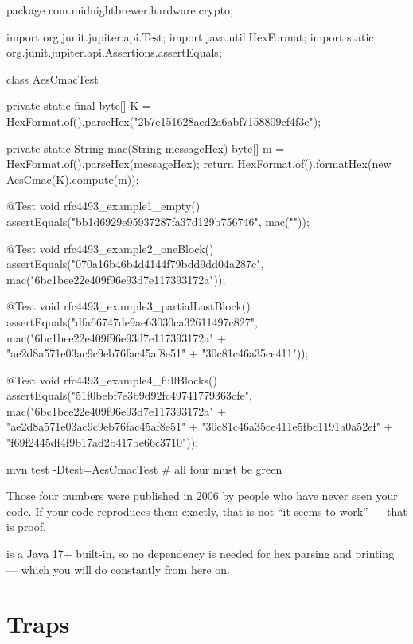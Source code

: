 \begin{jcode}
package com.midnightbrewer.hardware.crypto;

import org.junit.jupiter.api.Test;
import java.util.HexFormat;
import static org.junit.jupiter.api.Assertions.assertEquals;

class AesCmacTest {

    private static final byte[] K =
            HexFormat.of().parseHex("2b7e151628aed2a6abf7158809cf4f3c");

    private static String mac(String messageHex) {
        byte[] m = HexFormat.of().parseHex(messageHex);
        return HexFormat.of().formatHex(new AesCmac(K).compute(m));
    }

    @Test
    void rfc4493_example1_empty() {
        assertEquals("bb1d6929e95937287fa37d129b756746", mac(""));
    }

    @Test
    void rfc4493_example2_oneBlock() {
        assertEquals("070a16b46b4d4144f79bdd9dd04a287c",
                mac("6bc1bee22e409f96e93d7e117393172a"));
    }

    @Test
    void rfc4493_example3_partialLastBlock() {
        assertEquals("dfa66747de9ae63030ca32611497c827",
                mac("6bc1bee22e409f96e93d7e117393172a"
                  + "ae2d8a571e03ac9c9eb76fac45af8e51"
                  + "30c81c46a35ce411"));
    }

    @Test
    void rfc4493_example4_fullBlocks() {
        assertEquals("51f0bebf7e3b9d92fc49741779363cfe",
                mac("6bc1bee22e409f96e93d7e117393172a"
                  + "ae2d8a571e03ac9c9eb76fac45af8e51"
                  + "30c81c46a35ce411e5fbc1191a0a52ef"
                  + "f69f2445df4f9b17ad2b417be66c3710"));
    }
}
\end{jcode}

\begin{verifybox}
\begin{shell}
mvn test -Dtest=AesCmacTest      # all four must be green
\end{shell}
Those four numbers were published in 2006 by people who have never seen your
code. If your code reproduces them exactly, that is not ``it seems to work'' ---
that is proof.
\end{verifybox}

 is a Java 17+ built-in, so no dependency is needed for hex
parsing and printing --- which you will do constantly from here on.

\section{Traps}

